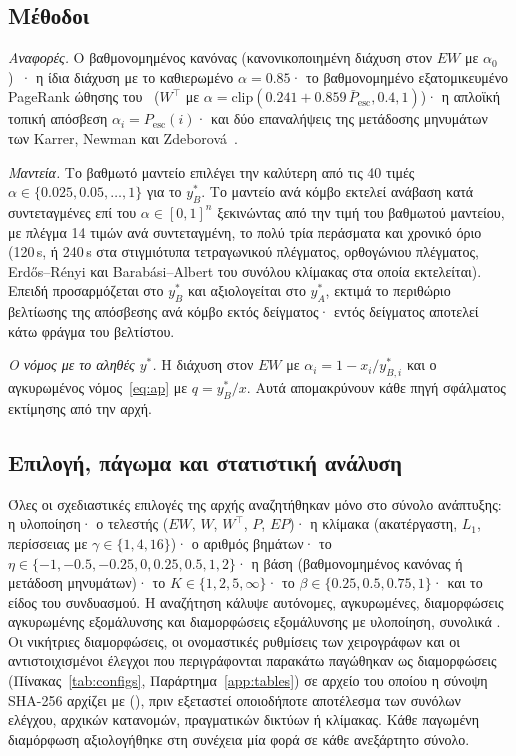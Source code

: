 \documentclass[11pt,a4paper]{article}
\theoremstyle{definition}
\theoremstyle{plain}
\newcommand{\Pesc}{P_{\mathrm{esc}}}
\newcommand{\Pescbar}{\bar{P}_{\mathrm{esc}}}
\newcommand{\clip}{\mathrm{clip}}
\begin{document}
\subsection{Μέθοδοι}\label{sec:methods}

\emph{Αναφορές.} Ο βαθμονομημένος κανόνας (κανονικοποιημένη διάχυση στον $EW$ με $\alpha_0$)~\cite{konstantellos26}· η ίδια διάχυση με το καθιερωμένο $\alpha=0.85$· το βαθμονομημένο εξατομικευμένο PageRank ώθησης του~\cite{konstantellos26} ($W^{\top}$ με $\alpha=\clip(0.241+0.859\,\Pescbar,0.4,1)$)· η απλοϊκή τοπική απόσβεση $\alpha_i=\Pesc(i)$· και δύο επαναλήψεις της μετάδοσης μηνυμάτων των Karrer, Newman και Zdeborová~\cite{knz14}.

\emph{Μαντεία.} Το βαθμωτό μαντείο επιλέγει την καλύτερη από τις 40 τιμές $\alpha\in\{0.025,0.05,\dots,1\}$ για το $y^*_B$. Το μαντείο ανά κόμβο εκτελεί ανάβαση κατά συντεταγμένες επί του $\alpha\in[0,1]^n$ ξεκινώντας από την τιμή του βαθμωτού μαντείου, με πλέγμα 14 τιμών ανά συντεταγμένη, το πολύ τρία περάσματα και χρονικό όριο (120\,s, ή 240\,s στα \NPernodeScale{} στιγμιότυπα τετραγωνικού πλέγματος, ορθογώνιου πλέγματος, Erdős--Rényi και Barabási--Albert του συνόλου κλίμακας στα οποία εκτελείται). Επειδή προσαρμόζεται στο $y^*_B$ και αξιολογείται στο $y^*_A$, εκτιμά το περιθώριο βελτίωσης της απόσβεσης ανά κόμβο εκτός δείγματος· εντός δείγματος αποτελεί κάτω φράγμα του βελτίστου.

\emph{Ο νόμος με το αληθές $y^*$.} Η διάχυση στον $EW$ με $\alpha_i=1-x_i/y^*_{B,i}$ και ο αγκυρωμένος νόμος~\eqref{eq:ap} με $q=y^*_B/x$. Αυτά απομακρύνουν κάθε πηγή σφάλματος εκτίμησης από την αρχή.

\subsection{Επιλογή, πάγωμα και στατιστική ανάλυση}\label{sec:stats}

Όλες οι σχεδιαστικές επιλογές της αρχής αναζητήθηκαν μόνο στο σύνολο ανάπτυξης: η υλοποίηση· ο τελεστής ($EW$, $W$, $W^{\top}$, $P$, $EP$)· η κλίμακα (ακατέργαστη, $L_1$, περίσσειας με $\gamma\in\{1,4,16\}$)· ο αριθμός βημάτων· το $\eta\in\{-1,-0.5,-0.25,0,0.25,0.5,1,2\}$· η βάση (βαθμονομημένος κανόνας ή μετάδοση μηνυμάτων)· το $K\in\{1,2,5,\infty\}$· το $\beta\in\{0.25,0.5,0.75,1\}$· και το είδος του συνδυασμού. Η αναζήτηση κάλυψε \CfgSA{} αυτόνομες, \CfgAP{} αγκυρωμένες, \CfgPB{} διαμορφώσεις αγκυρωμένης εξομάλυνσης και \CfgPBX{} διαμορφώσεις εξομάλυνσης με υλοποίηση, συνολικά \CfgTotal. Οι νικήτριες διαμορφώσεις, οι ονομαστικές ρυθμίσεις των χειρογράφων και οι αντιστοιχισμένοι έλεγχοι που περιγράφονται παρακάτω παγώθηκαν ως \NFrozen{} διαμορφώσεις (Πίνακας~\ref{tab:configs}, Παράρτημα~\ref{app:tables}) σε αρχείο του οποίου η σύνοψη SHA-256 αρχίζει με \texttt{\SelHash} (\SelTime), πριν εξεταστεί οποιοδήποτε αποτέλεσμα των συνόλων ελέγχου, αρχικών κατανομών, πραγματικών δικτύων ή κλίμακας. Κάθε παγωμένη διαμόρφωση αξιολογήθηκε στη συνέχεια μία φορά σε κάθε ανεξάρτητο σύνολο.
\end{document}
